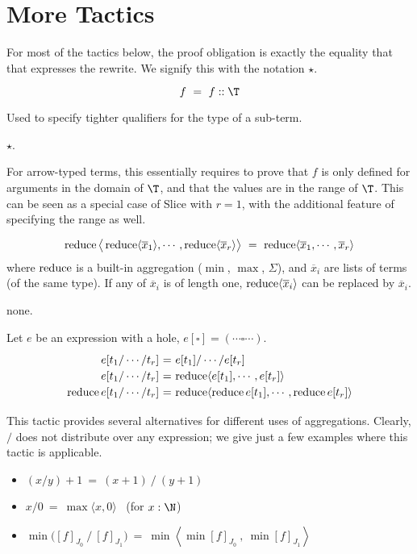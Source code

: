 \section{More Tactics}
\label{annex:more tactics}

\newcommand\self{$\star$}

For most of the tactics below, the proof obligation is exactly the equality that that
expresses the rewrite. We signify this with the notation \Obligations \self.

 \label{tactics:Shrink}
\[f ~=~ f :: \T\] 

Used to specify tighter qualifiers for the type of a sub-term.

\Obligations \self.

For arrow-typed terms, this essentially requires to prove that $f$ 
is only defined for arguments in the domain of $\T$, and that the values are in the range of $\T$.
This can be seen as a special case of {\sf Slice} with $r=1$, with the additional
feature of specifying the range as well.


\[\operatorname{reduce}\big\langle \operatorname{reduce}\langle\overline x_1\rangle,\cdots, \operatorname{reduce}\langle\overline x_r\rangle\big\rangle ~=~ \operatorname{reduce} \langle \overline x_1, \cdots, \overline x_r\rangle\]
%
where $\operatorname{reduce}$ is a built-in aggregation ($\min$, $\max$, $\Sigma$), 
and $\overline x_i$ are lists of terms (of the same type).
If any of $\overline x_i$ is of length one, $\operatorname{reduce}\langle\overline x_i\rangle$ can be
replaced by $\overline x_i$.

\Obligations none.

\vspace{3mm}
Let $e$ be an expression with a hole, $e[\square] = (\cdots \square \cdots)$.
%
\[\renewcommand\arraystretch{1.2}
  \begin{array}{@{}r@{~}c@{~}l@{}}
    e[t_1/\cdots/t_r] &=& e[t_1] / \cdots / e[t_r] \\
    e[t_1/\cdots/t_r] &=& \reduce\langle e[t_1],\cdots,e[t_r]\rangle \\
    \reduce e[t_1/\cdots/t_r] &=& \reduce\langle \reduce e[t_1],\cdots,\reduce e[t_r]\rangle
  \end{array}\]

This tactic provides several alternatives for different uses of aggregations.
Clearly, $\big/$ does not distribute over any expression; we give just a few examples
where this tactic is applicable.
\begin{itemize}
  \item $(x/y)+1 ~=~ (x+1)~/~(y+1)$
  \item $x/0 ~=~ \max\langle x,0\rangle$ ~(for $x:\N$)
  \item $\min \big([f]_{J_0}~\big/~[f]_{J_1}\big) ~=~
         \min\left\langle \min [f]_{J_0} ~,~ \min [f]_{J_1}\right\rangle$
\end{itemize}

